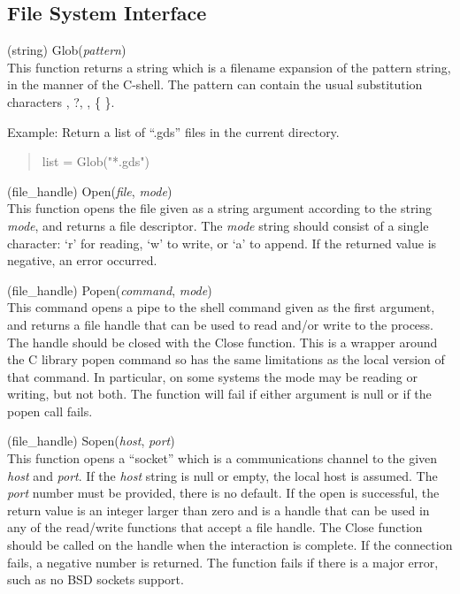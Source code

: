 \subsection{File System Interface}

\begin{description}
\item{(string) \vt Glob({\it pattern\/})}\\
This function returns a string which is a filename expansion of the
pattern string, in the manner of the C-shell.  The pattern can contain
the usual substitution characters {\vt *}, {\vt ?}, {\vt [ ]},
\{ \}.

Example:  Return a list of ``{\vt .gds}'' files in the current directory.
\begin{quote}\vt
list = Glob("*.gds")
\end{quote}

\item{(file\_handle) \vt Open({\it file\/}, {\it mode\/})}\\
This function opens the file given as a string argument according to
the string {\it mode\/}, and returns a file descriptor.  The {\it
mode\/} string should consist of a single character:  `{\vt r}' for
reading, `{\vt w}' to write, or `{\vt a}' to append.  If the returned
value is negative, an error occurred.

\item{(file\_handle) \vt Popen({\it command\/}, {\it mode\/})}\\
This command opens a pipe to the shell command given as the first
argument, and returns a file handle that can be used to read and/or
write to the process.  The handle should be closed with the {\vt
Close} function.  This is a wrapper around the C library {\vt popen}
command so has the same limitations as the local version of that
command.  In particular, on some systems the mode may be reading or
writing, but not both.  The function will fail if either argument is
null or if the {\vt popen} call fails.

\item{(file\_handle) \vt Sopen({\it host\/}, {\it port\/})}\\
This function opens a ``socket'' which is a communications channel to
the given {\it host} and {\it port}.  If the {\it host} string is null
or empty, the local host is assumed.  The {\it port} number must be
provided, there is no default.  If the open is successful, the return
value is an integer larger than zero and is a handle that can be used
in any of the read/write functions that accept a file handle.  The
{\vt Close} function should be called on the handle when the
interaction is complete.  If the connection fails, a negative number
is returned.  The function fails if there is a major error, such as no
BSD sockets support.


\end{description}
